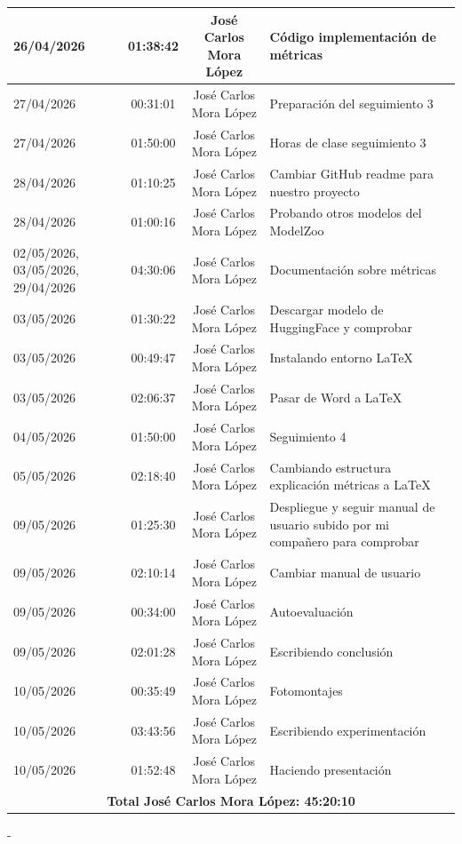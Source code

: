\documentclass[a4paper]{article}
\begin{document}
\begin{center}
\begin{tabular}{|p{3.5cm}|c|c|p{6cm}|}
26/04/2026 & 01:38:42 & José Carlos Mora López & Código implementación de métricas \\\hline
27/04/2026 & 00:31:01 & José Carlos Mora López & Preparación del seguimiento 3 \\\hline
27/04/2026 & 01:50:00 & José Carlos Mora López & Horas de clase seguimiento 3 \\\hline
28/04/2026 & 01:10:25 & José Carlos Mora López & Cambiar GitHub readme para nuestro proyecto \\\hline
28/04/2026 & 01:00:16 & José Carlos Mora López & Probando otros modelos del ModelZoo \\\hline
02/05/2026, 03/05/2026, 29/04/2026 & 04:30:06 & José Carlos Mora López & Documentación sobre métricas \\\hline
03/05/2026 & 01:30:22 & José Carlos Mora López & Descargar modelo de HuggingFace y comprobar \\\hline
03/05/2026 & 00:49:47 & José Carlos Mora López & Instalando entorno LaTeX \\\hline
03/05/2026 & 02:06:37 & José Carlos Mora López & Pasar de Word a LaTeX \\\hline
04/05/2026 & 01:50:00 & José Carlos Mora López & Seguimiento 4 \\\hline
05/05/2026 & 02:18:40 & José Carlos Mora López & Cambiando estructura explicación métricas a LaTeX \\\hline
09/05/2026 & 01:25:30 & José Carlos Mora López & Despliegue y seguir manual de usuario subido por mi compañero para comprobar \\\hline
09/05/2026 & 02:10:14 & José Carlos Mora López & Cambiar manual de usuario \\\hline
09/05/2026 & 00:34:00 & José Carlos Mora López & Autoevaluación \\\hline
09/05/2026 & 02:01:28 & José Carlos Mora López & Escribiendo conclusión \\\hline
10/05/2026 & 00:35:49 & José Carlos Mora López & Fotomontajes \\\hline
10/05/2026 & 03:43:56 & José Carlos Mora López & Escribiendo experimentación \\\hline
10/05/2026 & 01:52:48 & José Carlos Mora López & Haciendo presentación \\\hline
\multicolumn{4}{|c|}{\textbf{Total José Carlos Mora López: 45:20:10}} \\\hline
\end{tabular}
\end{center}

{}

-\newpage 
\end{document}
